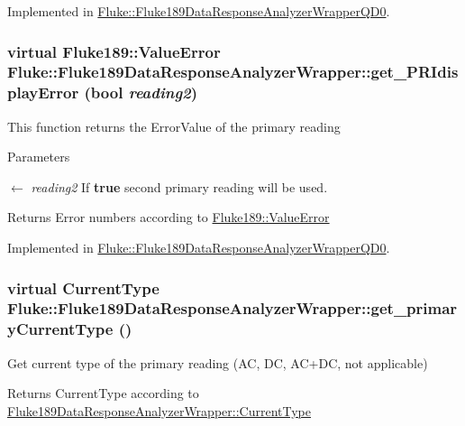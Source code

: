 Implemented in \hyperlink{classFluke_1_1Fluke189DataResponseAnalyzerWrapperQD0_ad28a17399ffe6a926990aafd5a1891d3}{Fluke::Fluke189DataResponseAnalyzerWrapperQD0}.\hypertarget{classFluke_1_1Fluke189DataResponseAnalyzerWrapper_ad10698c83895619a6fbf251c1256ce11}{
\subsubsection[{get\_\-PRIdisplayError}]{\setlength{\rightskip}{0pt plus 5cm}virtual {\bf Fluke189::ValueError} Fluke::Fluke189DataResponseAnalyzerWrapper::get\_\-PRIdisplayError (bool {\em reading2})}}
\label{classFluke_1_1Fluke189DataResponseAnalyzerWrapper_ad10698c83895619a6fbf251c1256ce11}
This function returns the ErrorValue of the primary reading 
\begin{DoxyParams}{Parameters}
\item[\mbox{$\leftarrow$} {\em reading2}]If {\bfseries true} second primary reading will be used. \end{DoxyParams}
\begin{DoxyReturn}{Returns}
Error numbers according to \hyperlink{classFluke_1_1Fluke189_a5dc0eaffde0a29a64cbcbd50d4178491}{Fluke189::ValueError} 
\end{DoxyReturn}


Implemented in \hyperlink{classFluke_1_1Fluke189DataResponseAnalyzerWrapperQD0_a4a3343d00db4cda2bf021074f2cfdadc}{Fluke::Fluke189DataResponseAnalyzerWrapperQD0}.\hypertarget{classFluke_1_1Fluke189DataResponseAnalyzerWrapper_afb7361d6963bb0edd9194ba72a1583df}{
\subsubsection[{get\_\-primaryCurrentType}]{\setlength{\rightskip}{0pt plus 5cm}virtual {\bf CurrentType} Fluke::Fluke189DataResponseAnalyzerWrapper::get\_\-primaryCurrentType ()}}
\label{classFluke_1_1Fluke189DataResponseAnalyzerWrapper_afb7361d6963bb0edd9194ba72a1583df}
Get current type of the primary reading (AC, DC, AC+DC, not applicable) \begin{DoxyReturn}{Returns}
CurrentType according to \hyperlink{classFluke_1_1Fluke189DataResponseAnalyzerWrapper_afef24496da239e3613c40ad3582d7adc}{Fluke189DataResponseAnalyzerWrapper::CurrentType} 
\end{DoxyReturn}


